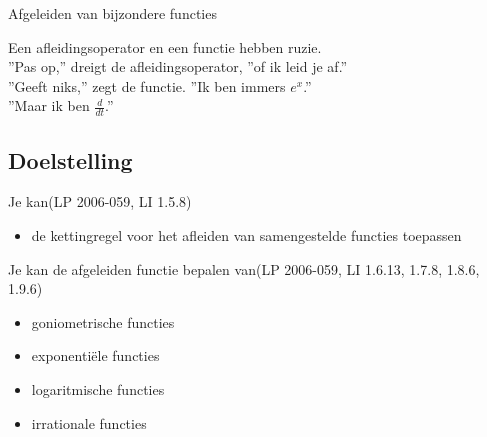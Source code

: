 \documentclass[12pt]{article}
\begin{document}
\pagestyle{fancy}
\lhead{}

\begin{theorie}

\thispagestyle{empty}
\begin{center}
  \begin{mdframed}
  \centering
  \fontsize{40}{40}\selectfont Afgeleiden van bijzondere functies
  \end{mdframed}
  \vfill
  \begin{center}
    \begin{minipage}{0.3\textwidth}
    Een afleidingsoperator en een functie hebben ruzie.\\
    ''Pas op,'' dreigt de afleidingsoperator, ''of ik leid je af.''\\
    ''Geeft niks,'' zegt de functie. ''Ik ben immers $e^x$.''\\
    ''Maar ik ben $\frac{d}{dt}$.''
    \end{minipage}
  \end{center}
  \vfill
\end{center}
\subsection*{Doelstelling}
Je kan\hfill  {\scriptsize(LP 2006-059, LI 1.5.8)}
\begin{itemize}
  \item de kettingregel voor het afleiden van samengestelde functies toepassen
\end{itemize}

Je kan de afgeleiden functie bepalen van\hfill  {\scriptsize(LP 2006-059, LI 1.6.13, 1.7.8, 1.8.6, 1.9.6)}
\begin{itemize}
  \item goniometrische functies
  \item exponentiële functies
  \item logaritmische functies
  \item irrationale functies
\end{itemize}


\pagestyle{empty}
\mbox{}
\newpage
\clearpage
\thispagestyle{empty}
\tableofcontents
\newpage
\clearpage
{}

\pagestyle{fancy}
\lhead{}

\end{theorie}

\onehalfspacing
\end{document}
